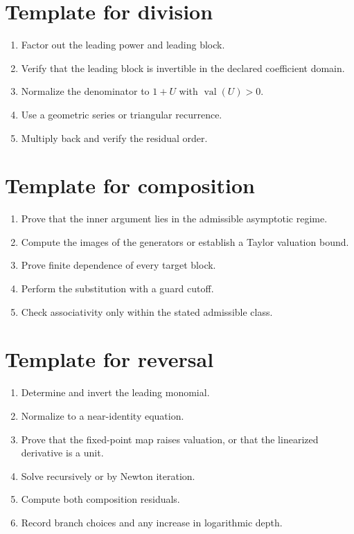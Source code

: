 \documentclass[11pt,openany]{book}
\theoremstyle{definition}
\theoremstyle{plain}
\theoremstyle{remark}
\DeclareMathOperator{\val}{val}
\begin{document}
\section{Template for division}
\begin{enumerate}
\item Factor out the leading power and leading block.
\item Verify that the leading block is invertible in the declared coefficient domain.
\item Normalize the denominator to \(1+U\) with \(\val(U)>0\).
\item Use a geometric series or triangular recurrence.
\item Multiply back and verify the residual order.
\end{enumerate}

\section{Template for composition}
\begin{enumerate}
\item Prove that the inner argument lies in the admissible asymptotic regime.
\item Compute the images of the generators or establish a Taylor valuation bound.
\item Prove finite dependence of every target block.
\item Perform the substitution with a guard cutoff.
\item Check associativity only within the stated admissible class.
\end{enumerate}

\section{Template for reversal}
\begin{enumerate}
\item Determine and invert the leading monomial.
\item Normalize to a near-identity equation.
\item Prove that the fixed-point map raises valuation, or that the linearized derivative is a unit.
\item Solve recursively or by Newton iteration.
\item Compute both composition residuals.
\item Record branch choices and any increase in logarithmic depth.
\end{enumerate}
\end{document}
